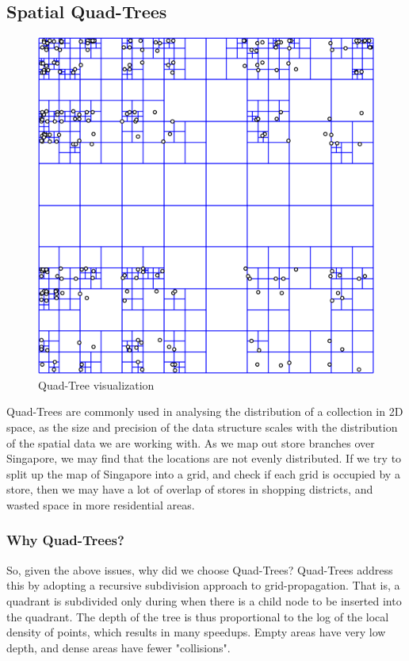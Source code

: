\documentclass[12pt]{article}
\begin{document}
{\subsection{Spatial Quad-Trees}
\begin{figure}
    \centering
    \includegraphics[scale=0.3]{../img/quadtree.png}
    \caption{Quad-Tree visualization}
    \label{fig:my_label}
\end{figure}
Quad-Trees are commonly used in analysing the distribution of a collection in 2D space, as the size and precision of the data structure scales with the distribution of the spatial data we are working with. As we map out store branches over Singapore, we may find that the locations are not evenly distributed. If we try to split up the map of Singapore into a grid, and check if each grid is occupied by a store, then we may have a lot of overlap of stores in shopping districts, and wasted space in more residential areas.

\subsubsection{Why Quad-Trees?}

So, given the above issues, why did we choose Quad-Trees? Quad-Trees address this by adopting a recursive subdivision approach to grid-propagation. That is, a quadrant is subdivided only during when there is a child node to be inserted into the quadrant. The depth of the tree is thus proportional to the log of the local density of points, which results in many speedups. Empty areas have very low depth, and dense areas have fewer "collisions".

}
\end{document}
